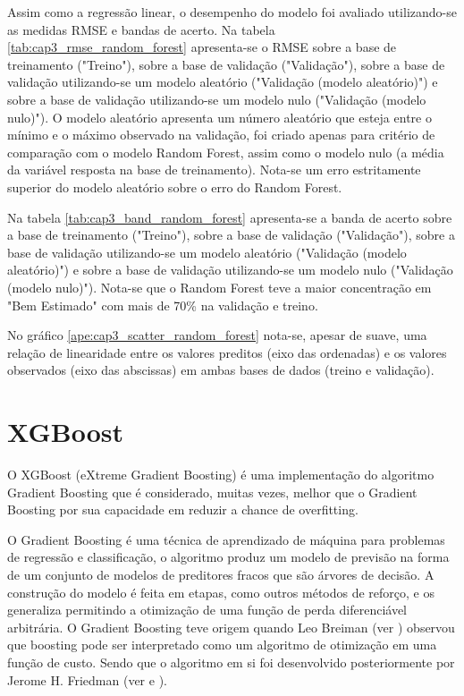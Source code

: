 Assim como a regressão linear, o desempenho do modelo foi avaliado utilizando-se as medidas RMSE e bandas de acerto. Na tabela \ref{tab:cap3_rmse_random_forest} apresenta-se o RMSE sobre a base de treinamento ("Treino"), sobre a base de validação ("Validação"), sobre a base de validação utilizando-se um modelo aleatório ("Validação (modelo aleatório)") e sobre a base de validação utilizando-se um modelo nulo ("Validação (modelo nulo)"). O modelo aleatório apresenta um número aleatório que esteja entre o mínimo e o máximo observado na validação, foi criado apenas para critério de comparação com o modelo Random Forest, assim como o modelo nulo (a média da variável resposta na base de treinamento). Nota-se um erro estritamente superior do modelo aleatório sobre o erro do Random Forest.

Na tabela \ref{tab:cap3_band_random_forest} apresenta-se a banda de acerto sobre a base de treinamento ("Treino"), sobre a base de validação ("Validação"), sobre a base de validação utilizando-se um modelo aleatório ("Validação (modelo aleatório)") e sobre a base de validação utilizando-se um modelo nulo ("Validação (modelo nulo)"). Nota-se que o Random Forest teve a maior concentração em "Bem Estimado" com mais de 70\% na validação e treino.

No gráfico \ref{ape:cap3_scatter_random_forest} nota-se, apesar de suave, uma relação de linearidade entre os valores preditos (eixo das ordenadas) e os valores observados (eixo das abscissas) em ambas bases de dados (treino e validação).

\section{XGBoost}
\label{sec:xgboost}

O XGBoost (eXtreme Gradient Boosting) é uma implementação do algoritmo Gradient Boosting que é considerado, muitas vezes, melhor que o Gradient Boosting por sua capacidade em reduzir a chance de overfitting.

O Gradient Boosting é uma técnica de aprendizado de máquina para problemas de regressão e classificação, o algoritmo produz um modelo de previsão na forma de um conjunto de modelos de preditores fracos que são árvores de decisão. A construção do modelo é feita em etapas, como outros métodos de reforço, e os generaliza permitindo a otimização de uma função de perda diferenciável arbitrária. O Gradient Boosting teve origem quando Leo Breiman (ver \citet{Breiman1997}) observou que boosting pode ser interpretado como um algoritmo de otimização em uma função de custo. Sendo que o algoritmo em si foi desenvolvido posteriormente por Jerome H. Friedman (ver \citet{Friedman199902} e \citet{Friedman199903}).

